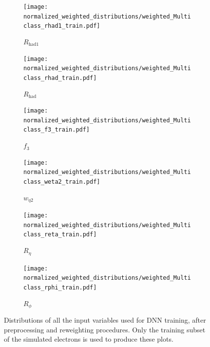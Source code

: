 \begin{figure}[htbp]
  \centering

  \begin{subfigure}[b]{0.49\textwidth}
    \centering
    \texttt{[image: normalized\_weighted\_distributions/weighted\_Multiclass\_rhad1\_train.pdf]}
    \caption{$R_{\text{had1}}$}
    \label{fig:input1}
  \end{subfigure}\hfill
  \begin{subfigure}[b]{0.49\textwidth}
    \centering
    \texttt{[image: normalized\_weighted\_distributions/weighted\_Multiclass\_rhad\_train.pdf]}
    \caption{$R_{\text{had}}$}
    \label{fig:input2}
  \end{subfigure}

  \vspace{0.45cm}

  \begin{subfigure}[b]{0.49\textwidth}
    \centering
    \texttt{[image: normalized\_weighted\_distributions/weighted\_Multiclass\_f3\_train.pdf]}
    \caption{$f_3$}
    \label{fig:input3}
  \end{subfigure}\hfill
  \begin{subfigure}[b]{0.49\textwidth}
    \centering
    \texttt{[image: normalized\_weighted\_distributions/weighted\_Multiclass\_weta2\_train.pdf]}
    \caption{$w_{\eta2}$}
    \label{fig:input4}
  \end{subfigure}

  \vspace{0.45cm}

  \begin{subfigure}[b]{0.49\textwidth}
    \centering
    \texttt{[image: normalized\_weighted\_distributions/weighted\_Multiclass\_reta\_train.pdf]}
    \caption{$R_{\eta}$}
    \label{fig:input5}
  \end{subfigure}\hfill
  \begin{subfigure}[b]{0.49\textwidth}
    \centering
    \texttt{[image: normalized\_weighted\_distributions/weighted\_Multiclass\_rphi\_train.pdf]}
    \caption{$R_{\phi}$}
    \label{fig:input6}
  \end{subfigure}

  \caption{Distributions of all the input variables used for DNN training, after preprocessing and reweighting procedures. Only the training subset of the simulated electrons is used to produce these plots.}
  \label{fig:dnn_inputs_distributions_A}
\end{figure}

